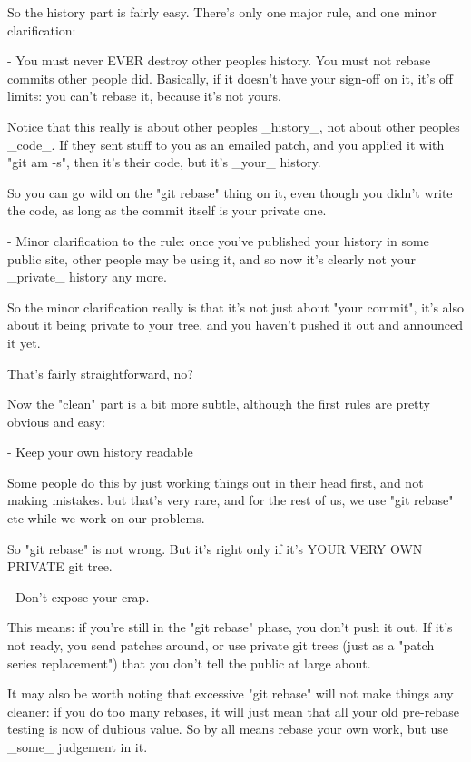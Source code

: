 So the history part is fairly easy. There's only one major rule, and one 
minor clarification:

 - You must never EVER destroy other peoples history. You must not rebase 
   commits other people did. Basically, if it doesn't have your sign-off 
   on it, it's off limits: you can't rebase it, because it's not yours.

   Notice that this really is about other peoples _history_, not about 
   other peoples _code_. If they sent stuff to you as an emailed patch, 
   and you applied it with "git am -s", then it's their code, but it's 
   _your_ history.

   So you can go wild on the "git rebase" thing on it, even though you 
   didn't write the code, as long as the commit itself is your private 
   one.

 - Minor clarification to the rule: once you've published your history in 
   some public site, other people may be using it, and so now it's clearly 
   not your _private_ history any more.

   So the minor clarification really is that it's not just about "your 
   commit", it's also about it being private to your tree, and you haven't 
   pushed it out and announced it yet.

That's fairly straightforward, no?

Now the "clean" part is a bit more subtle, although the first rules are 
pretty obvious and easy:

 - Keep your own history readable

   Some people do this by just working things out in their head first, and 
   not making mistakes. but that's very rare, and for the rest of us, we 
   use "git rebase" etc while we work on our problems. 

   So "git rebase" is not wrong. But it's right only if it's YOUR VERY OWN 
   PRIVATE git tree.

 - Don't expose your crap.

   This means: if you're still in the "git rebase" phase, you don't push 
   it out. If it's not ready, you send patches around, or use private git 
   trees (just as a "patch series replacement") that you don't tell the 
   public at large about.

It may also be worth noting that excessive "git rebase" will not make 
things any cleaner: if you do too many rebases, it will just mean that all 
your old pre-rebase testing is now of dubious value. So by all means 
rebase your own work, but use _some_ judgement in it.

